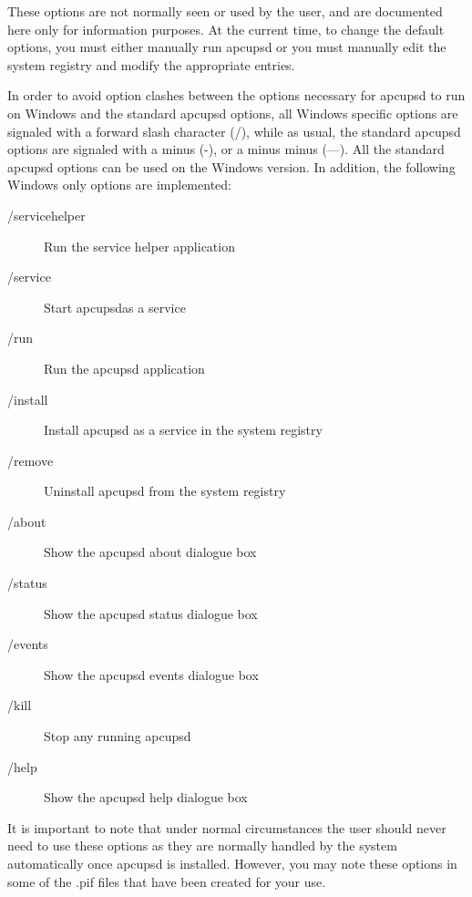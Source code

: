 {{{{{{{{{\label{index-Windows_002c-Options-186}
These options are not normally seen or used by the user, and are documented
here only for information purposes. At the current time, to change the default
options, you must either manually run apcupsd or you must manually edit the
system registry and modify the appropriate entries.  

In order to avoid option clashes between the options necessary for apcupsd to
run on Windows and the standard apcupsd options, all Windows specific options
are signaled with a forward slash character (/), while as usual, the standard
apcupsd options are signaled with a minus (-), or a minus minus ({---}). All
the standard apcupsd options can be used on the Windows version. In addition,
the following Windows only options are implemented:  

\begin{description}

\item [/servicehelper]
   Run the service helper application  

\item [/service]
   Start apcupsdas a service  

\item [/run]
   Run the apcupsd application  

\item [/install]
   Install apcupsd as a service in the system registry  

\item [/remove]
   Uninstall apcupsd from the system registry  

\item [/about]
   Show the apcupsd about dialogue box  

\item [/status]
   Show the apcupsd status dialogue box  

\item [/events]
   Show the apcupsd events dialogue box  

\item [/kill]
   Stop any running apcupsd  

\item [/help]
   Show the apcupsd help dialogue box 
\end{description}

It is important to note that under normal circumstances the user should never
need to use these options as they are normally handled by the system
automatically once apcupsd is installed. However, you may note these options
in some of the .pif files that have been created for your use. 

}}}}}}}}}
